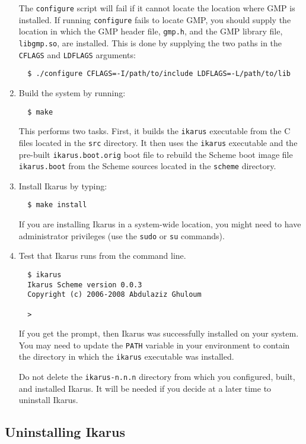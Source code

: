\documentclass[onecolumn, 12pt, twoside, openright, dvipdfm]{book}
\begin{document}
\begin{enumerate}
The \texttt{configure} script will fail if it cannot locate the
location where GMP is installed.  If running \texttt{configure}
fails to locate GMP, you should supply the location in which the GMP
header file, \texttt{gmp.h}, and the GMP library file,
\texttt{libgmp.so}, are installed.  This is done by supplying the
two paths in the \texttt{CFLAGS} and \texttt{LDFLAGS} arguments:

\begin{verbatim}
  $ ./configure CFLAGS=-I/path/to/include LDFLAGS=-L/path/to/lib
\end{verbatim}

\item Build the system by running:
\begin{verbatim}
  $ make
\end{verbatim}
This performs two
tasks.  First, it builds the \texttt{ikarus} executable from the C
files located in the \texttt{src} directory.  It then uses the
\texttt{ikarus} executable and the pre-built
\texttt{ikarus.boot.orig} boot file to rebuild the Scheme boot image
file \texttt{ikarus.boot} from the Scheme sources located in the
\texttt{scheme} directory.

\item Install Ikarus by typing:
\begin{verbatim}
  $ make install
\end{verbatim}
If you are installing Ikarus in a system-wide location, you might
need to have administrator privileges (use the \texttt{sudo} or
\texttt{su} commands).

\item Test that Ikarus runs from the command line.
\begin{verbatim}
  $ ikarus
  Ikarus Scheme version 0.0.3
  Copyright (c) 2006-2008 Abdulaziz Ghuloum

  > 
\end{verbatim}
If you get the prompt, then Ikarus was successfully installed on
your system.  You may need to update the \texttt{PATH} variable in
your environment to contain the directory in which the
\texttt{ikarus} executable was installed.

Do not delete the \texttt{ikarus-n.n.n} directory from which you
configured, built, and installed Ikarus.  It will be needed if you
decide at a later time to uninstall Ikarus.

\end{enumerate}

\subsection{Uninstalling Ikarus}
\end{document}
